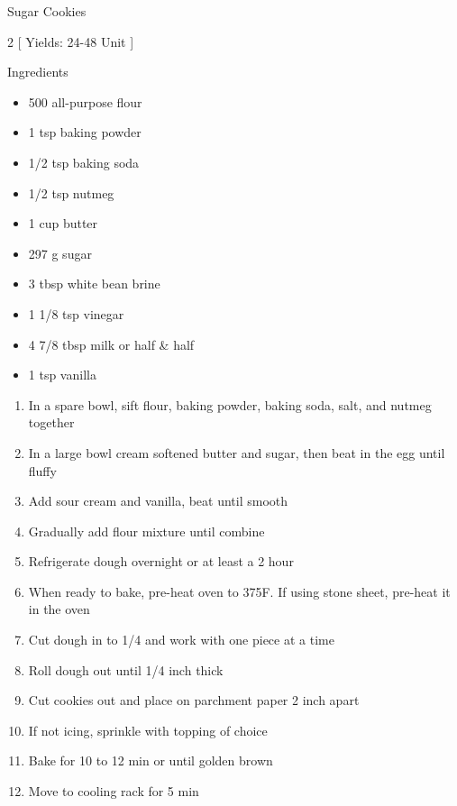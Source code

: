 \begin{Large}
    Sugar Cookies
\end{Large}

\begin{scriptsize}
\begin{multicols}{2}
[
\vspace{1em}
Yields: 24-48 Unit
\vspace{-1.5em}
]

Ingredients
\begin{itemize}
    \item 500 all-purpose flour
    \item 1 tsp baking powder
    \item 1/2 tsp baking soda
    \item 1/2 tsp nutmeg

    \item 1 cup butter
    \item 297 g sugar
    \item 3 tbsp white bean brine
    \item 1 1/8 tsp vinegar
    \item 4 7/8 tbsp milk or half \& half
    \item 1 tsp vanilla
\end{itemize}
\end{multicols}
\end{scriptsize}

\begin{footnotesize}
\begin{enumerate}
    \item In a spare bowl, sift flour, baking powder, baking soda, salt, and nutmeg together
    \item In a large bowl cream softened butter and sugar, then beat in the egg until fluffy
    \item Add sour cream and vanilla, beat until smooth
    \item Gradually add flour mixture until combine
    \item Refrigerate dough overnight or at least a 2 hour
    \item When ready to bake, pre-heat oven to 375\degree F.  If using stone sheet, pre-heat it in the oven
    \item Cut dough in to 1/4 and work with one piece at a time
    \item Roll dough out until 1/4 inch thick
    \item Cut cookies out and place on parchment paper 2 inch apart
    \item If not icing, sprinkle with topping of choice
    \item Bake for 10 to 12 min or until golden brown
    \item Move to cooling rack for 5 min
\end{enumerate}
\end{footnotesize}

\vspace{2em}
